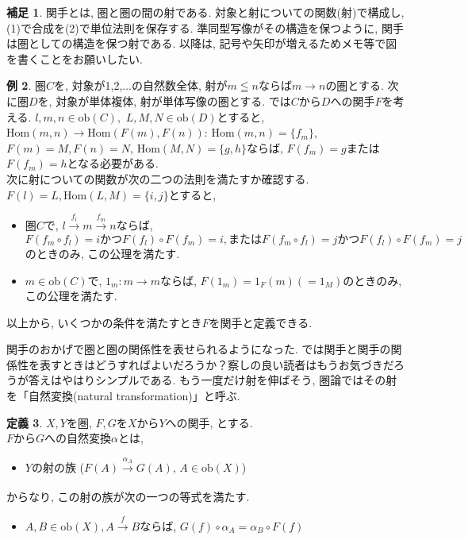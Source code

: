 \documentclass[a4paper]{jsarticle}
\theoremstyle{definition}
\newtheorem{dfn}{定義}[section]
\newtheorem{exam}[dfn]{例}
\newtheorem{hsk}[dfn]{補足}
\newcommand{\Hom}{{\mathrm{Hom}}}
\newcommand{\ob}{{\mathrm{ob}}}
\begin{document}
\begin{hsk}
    関手とは, 圏と圏の間の射である. 対象と射についての関数(射)で構成し, (1)で合成を(2)で単位法則を保存する. 準同型写像がその構造を保つように, 関手は圏としての構造を保つ射である. 以降は, 記号や矢印が増えるためメモ等で図を書くことをお願いしたい.\\
\end{hsk}
\begin{exam}
    圏$C$を, 対象が1,2,...の自然数全体, 射が$m\leqq n$ならば$m \rightarrow n$の圏とする. 次に圏$D$を, 対象が単体複体, 射が単体写像の圏とする. では$C$から$D$への関手$F$を考える. $l, m, n\in\ob (C), $ $ L, M, N\in\ob(D)$とすると,\\ 
    $\Hom (m, n)\rightarrow \Hom (F(m), F(n))$: $\Hom (m, n)=\{f_m\}$, $F(m)=M, F(n)=N$, $\Hom (M, N)=\{g, h\}$ならば, $F(f_m)=g$または$F(f_m)=h$となる必要がある.\\
    次に射についての関数が次の二つの法則を満たすか確認する.\\
    $F(l)=L, \Hom (L, M)=\{i,j\}$とすると, 
    
    \begin{itemize}
        \item[(1)] 圏$C$で, $l\stackrel{f_l}{\to} m\stackrel{f_m}{\to} n$ならば, $F(f_m\circ f_l) =i かつ F(f_l)\circ F(f_m) = i, またはF(f_m\circ f_l) =j かつ F(f_l)\circ F(f_m) = j$のときのみ, この公理を満たす.
        \item [(2)] $m\in$ob$(C)$で, $1_m:m\rightarrow m$ならば, $F(1_m) = 1_F(m)(=1_M)$のときのみ, この公理を満たす.
    \end{itemize}
    以上から, いくつかの条件を満たすとき$F$を関手と定義できる.\\
\end{exam}
関手のおかげで圏と圏の関係性を表せられるようになった. では関手と関手の関係性を表すときはどうすればよいだろうか？察しの良い読者はもうお気づきだろうが答えはやはりシンプルである. もう一度だけ射を伸ばそう, 圏論ではその射を「自然変換(natural transformation)」と呼ぶ.
\begin{dfn}
    $X, Y$を圏, $F, G$を$X$から$Y$への関手, とする.\\
    $F$から$G$への自然変換$\alpha$とは,
    \begin{itemize}
        \item $Y$の射の族 ($F(A)\xrightarrow[]{\alpha_A} G(A)$, $A\in\ob(X)$)
    \end{itemize}
    からなり, この射の族が次の一つの等式を満たす.
    \begin{itemize}
        \item $A, B\in\ob(X), A\xrightarrow[]{f}B$ならば, $G(f)\circ \alpha_A = \alpha_B\circ F(f)$
    \end{itemize}
\end{dfn}
\end{document}
